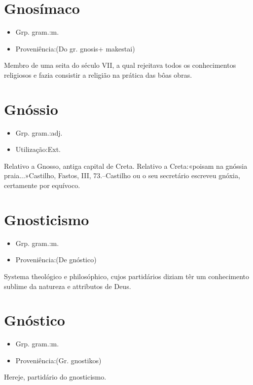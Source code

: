\section{Gnosímaco}
\begin{itemize}
\item {Grp. gram.:m.}
\end{itemize}
\begin{itemize}
\item {Proveniência:(Do gr. \textunderscore gnosis\textunderscore  + \textunderscore makestai\textunderscore )}
\end{itemize}
Membro de uma seita do século VII, a qual rejeitava todos os conhecimentos religiosos e fazia consistir a religião na prática das bôas obras.
\section{Gnóssio}
\begin{itemize}
\item {Grp. gram.:adj.}
\end{itemize}
\begin{itemize}
\item {Utilização:Ext.}
\end{itemize}
Relativo a Gnosso, antiga capital de Creta.
Relativo a Creta:«\textunderscore poisam na gnóssia praia...\textunderscore »Castilho, \textunderscore Fastos\textunderscore , III, 73.--Castilho ou o seu secretário escreveu \textunderscore gnóxia\textunderscore , certamente por equívoco.
\section{Gnosticismo}
\begin{itemize}
\item {Grp. gram.:m.}
\end{itemize}
\begin{itemize}
\item {Proveniência:(De \textunderscore gnóstico\textunderscore )}
\end{itemize}
Systema theológico e philosóphico, cujos partidários diziam têr um conhecimento sublime da natureza e attributos de Deus.
\section{Gnóstico}
\begin{itemize}
\item {Grp. gram.:m.}
\end{itemize}
\begin{itemize}
\item {Proveniência:(Gr. \textunderscore gnostikos\textunderscore )}
\end{itemize}
Hereje, partidário do gnosticismo.
